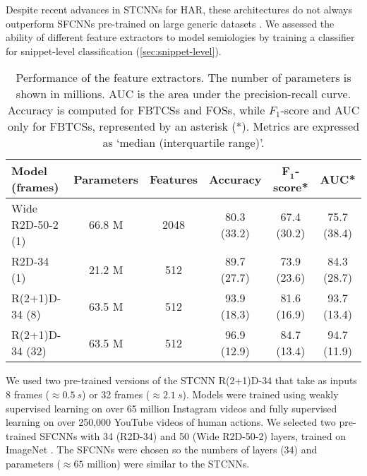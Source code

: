 Despite recent advances in \acp{STCNN} for \ac{HAR}, these architectures do not always outperform \acp{SFCNN} pre-trained on large generic datasets \cite{hutchinson_accuracy_2020}.
We assessed the ability of different feature extractors to model semiologies by training a classifier for snippet-level classification (\cref{sec:snippet-level}).

\begin{table}
  \setlength{\tabcolsep}{3pt}
  \centering
  \caption[Performance of the feature extractors]{
    Performance of the feature extractors.
    The number of parameters is shown in millions.
    AUC is the area under the precision-recall curve.
    Accuracy is computed for \acp{FBTCS} and \acp{FOS}, while $F_1$-score and AUC only for \acp{FBTCS}, represented by an asterisk (*).
    Metrics are expressed as `median (interquartile range)'.
  }
  \label{tab:models}
  \begin{tabular}{l*5c}
    \toprule
    \textbf{Model (frames)} & \textbf{Parameters} & \textbf{Features} & \textbf{Accuracy} & $\bm{F_1}$\textbf{-score}* & \textbf{AUC}* \\
    \midrule
    Wide R2D-50-2 (1)       &              66.8 M &              2048 &       80.3 (33.2) &                67.4 (30.2) &   75.7 (38.4) \\
    R2D-34 (1)              &              21.2 M &               512 &       89.7 (27.7) &                73.9 (23.6) &   84.3 (28.7) \\
    R(2+1)D-34 (8)          &              63.5 M &               512 &       93.9 (18.3) &                81.6 (16.9) &   93.7 (13.4) \\
    R(2+1)D-34 (32)         &              63.5 M &               512 &       96.9 (12.9) &                84.7 (13.4) &   94.7 (11.9) \\
    \bottomrule
  \end{tabular}
\end{table}

We used two pre-trained versions of the \ac{STCNN} R(2+1)D-34 \cite{ghadiyaram_large-scale_2019} that take as inputs 8 frames ($\approx \SI{0.5}{s}$) or 32 frames ($\approx \SI{2.1}{s}$).
Models were trained using weakly supervised learning on over 65 million Instagram videos and fully supervised learning on over 250,000 YouTube videos of human actions.
We selected two pre-trained \acp{SFCNN} with 34 (R2D-34) and 50 (Wide R2D-50-2) layers, trained on ImageNet \cite{zagoruyko_wide_2017}.
The \acp{SFCNN} were chosen so the numbers of layers (34) and parameters ($\approx 65$ million) were similar to the \acp{STCNN}.

